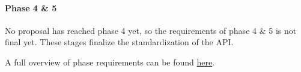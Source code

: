 \paragraph{Phase 4 \& 5}

No proposal has reached phase 4 yet, so the requirements of phase 4 \& 5 is not final yet. These stages finalize the standardization of the API.


A full overview of phase requirements can be found \href{https://github.com/WebAssembly/meetings/blob/main/process/phases.md}{here}.

